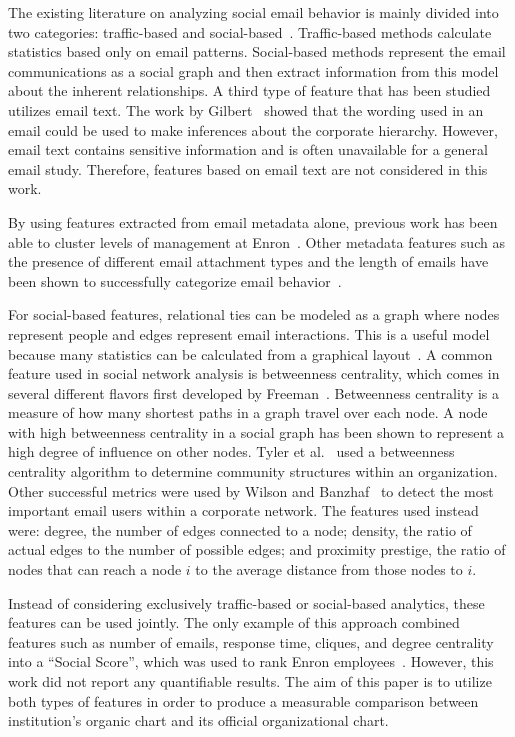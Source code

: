 \documentclass[10pt,twocolumn,conference]{IEEEtran}
\begin{document}
The existing literature on analyzing social email behavior is mainly divided into two categories: traffic-based and social-based~\cite{tang_email_2013}.
Traffic-based methods calculate statistics based only on email patterns.
Social-based methods represent the email communications as a social graph and then extract information from this model about the inherent relationships.
A third type of feature that has been studied utilizes email text.
The work by Gilbert~\cite{gilbert2012phrases} showed that the wording used in an email could be used to make inferences about the corporate hierarchy.
However, email text contains sensitive information and is often unavailable for a general email study.
Therefore, features based on email text are not considered in this work.

By using features extracted from email metadata alone, previous work has been able to cluster levels of management at Enron~\cite{yelupula_social_2008}.
Other metadata features such as the presence of different email attachment types and the length of emails have been shown to successfully categorize email behavior~\cite{martin_analyzing_2005}.

For social-based features, relational ties can be modeled as a graph where nodes represent people and edges represent email interactions.
This is a useful model because many statistics can be calculated from a graphical layout~\cite{wasserman_social_1994}.
A common feature used in social network analysis is betweenness centrality, which comes in several different flavors first developed by Freeman~\cite{freeman_set_1977}.
Betweenness centrality is a measure of how many shortest paths in a graph travel over each node.
A node with high betweenness centrality in a social graph has been shown to represent a high degree of influence on other nodes.
Tyler et al.~\cite{tyler_email_2003} used a betweenness centrality algorithm to determine community structures within an organization.
Other successful metrics were used by Wilson and Banzhaf~\cite{wilson_discovery_2009} to detect the most important email users within a corporate network.
The features used instead were: degree, the number of edges connected to a node; density, the ratio of actual edges to the number of possible edges; and proximity prestige, the ratio of nodes that can reach a node $i$ to the average distance from those nodes to $i$.

Instead of considering exclusively traffic-based or social-based analytics, these features can be used jointly.
The only example of this approach combined features such as number of emails, response time, cliques, and degree centrality into a ``Social Score'', which was used to rank Enron employees~\cite{rowe_automated_2007}.  
However, this work did not report any quantifiable results.
The aim of this paper is to utilize both types of features in order to produce a measurable comparison between institution's organic chart and its official organizational chart.
\end{document}
